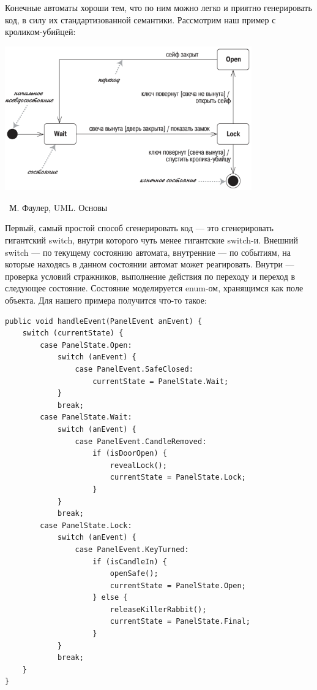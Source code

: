 \documentclass[a5paper]{article}
\newcommand{\attribution}[1] {
    \vspace{-5mm}\begin{flushright}\begin{scriptsize}%
    {\textcopyright\, #1}\end{scriptsize}\end{flushright}
}
\begin{document}
Конечные автоматы хороши тем, что по ним можно легко и приятно генерировать код, в силу их стандартизованной семантики. Рассмотрим наш пример с кроликом-убийцей:

\begin{center}
    \includegraphics[width=0.8\textwidth]{stateTransitionSyntax.png}
    \attribution{М. Фаулер, UML. Основы}
\end{center}

Первый, самый простой способ сгенерировать код --- это сгенерировать гигантский switch, внутри которого чуть менее гигантские switch-и. Внешний switch --- по текущему состоянию автомата, внутренние --- по событиям, на которые находясь в данном состоянии автомат может реагировать. Внутри --- проверка условий стражников, выполнение действия по переходу и переход в следующее состояние. Состояние моделируется enum-ом, хранящимся как поле объекта. Для нашего примера получится что-то такое:

\begin{verbatim}
public void handleEvent(PanelEvent anEvent) {
    switch (currentState) {
        case PanelState.Open:
            switch (anEvent) {
                case PanelEvent.SafeClosed:
                    currentState = PanelState.Wait;
            }
            break;
        case PanelState.Wait:
            switch (anEvent) {
                case PanelEvent.CandleRemoved:
                    if (isDoorOpen) {
                        revealLock();
                        currentState = PanelState.Lock;
                    }
            }
            break;
        case PanelState.Lock:
            switch (anEvent) {
                case PanelEvent.KeyTurned:
                    if (isCandleIn) {
                        openSafe();
                        currentState = PanelState.Open;
                    } else {
                        releaseKillerRabbit();
                        currentState = PanelState.Final;
                    }
            }
            break;
    }
}
\end{verbatim}
\end{document}
